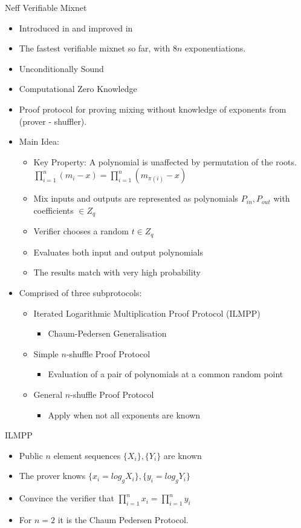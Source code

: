 \documentclass{beamer}
\begin{document}
\begin{frame}[allowframebreaks]{Neff Verifiable Mixnet}
\begin{itemize}
\item Introduced in \cite{Neff01} and improved in \cite{Neff04}
\item The fastest verifiable mixnet so far, with $8n$ exponentiations. 
\item Unconditionally Sound
\item Computational Zero Knowledge
\item Proof protocol for proving mixing without knowledge of exponents from (prover - shuffler).
\item Main Idea:
\begin{itemize}
\item Key Property: A polynomial is unaffected by permutation of the roots.
$ \prod_{i=1}^n (m_i - x) = \prod_{i=1}^n (m_{\pi(i)} - x) $
\item Mix inputs and outputs are represented as polynomials $P_{in}, P_{out}$ with coefficients $\in Z_q$
\item Verifier chooses a random $t \in Z_q$
\item Evaluates both input and output polynomials
\item The results match with very high probability
\end{itemize}
\item Comprised of three subprotocols:
\begin{itemize}
\item Iterated Logarithmic Multiplication Proof Protocol (ILMPP)
\begin{itemize}
\item Chaum-Pedersen Generalisation
\end{itemize} 
\item Simple $n$-shuffle Proof Protocol
\begin{itemize}
\item  Evaluation of a pair of polynomials at a common random point
\end{itemize} 
\item General $n$-shuffle Proof Protocol
\begin{itemize}
\item  Apply when not all exponents are known
\end{itemize} 
\end{itemize}
\end{itemize}

\begin{block}{ILMPP}
\begin{itemize}
\item Public $n$ element sequences $\{X_i\},\{Y_i\}$ are known
\item The prover knows $\{x_i = log_g X_i\},\{y_i = log_g Y_i\}$
\item Convince the verifier that $ \prod_{i=1}^{n} x_i = \prod_{i=1}^{n} y_i$
\item For $n = 2$ it is the Chaum Pedersen Protocol.
\end{itemize}
\end{block}


\end{frame}
\end{document}
